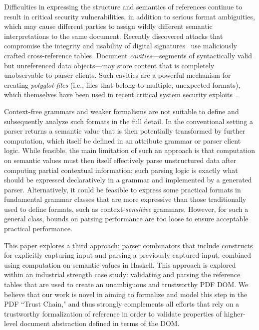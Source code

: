 Difficulties in expressing the structure and semantics of references
continue to result in critical security vulnerabilities, in addition
to serious format ambiguities, which may cause different parties to
assign wildly different semantic interpretations to the same document.
%
Recently discovered attacks that compromise the integrity and
usability of digital
signatures~\cite{rohlmannBreakingSpecificationPDF2021,
  mainkaShadowAttacksHiding2021} use maliciously crafted
cross-reference tables.
%
Document \emph{cavities}---segments of syntactically valid but
unreferenced data objects---may store content that is completely
unobservable to parser clients.
%
Such cavities are a powerful mechanism for creating \emph{polyglot
  files} (i.e., files that belong to multiple, unexpected formats),
which themselves have been used in recent critical system security
exploits~\cite{psychicPaper}.

Context-free grammars and weaker formalisms are not suitable to define
and subsequently analyze such formats in the full detail.
%
In the conventional setting a parser returns a semantic value
that is then potentially transformed by further computation, which 
itself be defined in an attribute grammar or parser client logic.
%
While feasible, the main limitation of such an approach is that
computation on semantic values must then itself effectively parse
unstructured data after computing partial contextual information;
%
such parsing logic is exactly what should be expressed declaratively
in a grammar and implemented by a generated parser.
%
Alternatively, it could be feasible to express some practical formats
in fundamental grammar classes that are more expressive than those
traditionally used to define formats, such as context-\emph{sensitive}
grammars.
%
However, for such a general class, bounds on parsing performance are
too loose to ensure acceptable practical performance.

This paper explores a third approach: parser combinators that include
constructs for explicitly capturing input and parsing a
previously-captured input, combined using computation on semantic
values in Haskell.
%
This approach is explored within an industrial strength case study:
validating and parsing the reference tables that are used to create 
an unambiguous and trustworthy PDF DOM.
%
We believe that our work is novel in aiming to formalize and model
this step in the PDF ``Trust Chain," and thus strongly complements all
efforts that rely on a trustworthy formalization of reference in order
to validate properties of higher-level document abstraction defined in
terms of the DOM.

